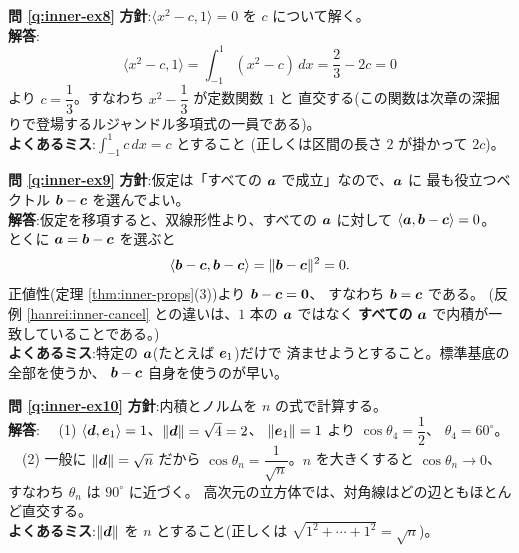 \bigskip
\noindent\textbf{問 \ref{q:inner-ex8}}\quad
\textbf{方針}:$\langle x^2 - c, 1 \rangle = 0$ を $c$ について解く。\\
\textbf{解答}:
\[
\langle x^2 - c, 1 \rangle = \int_{-1}^{1} (x^2 - c)\,dx
= \frac{2}{3} - 2c = 0
\]
より $c = \dfrac{1}{3}$。すなわち $x^2 - \dfrac{1}{3}$ が定数関数 $1$ と
直交する(この関数は次章の深掘りで登場するルジャンドル多項式の一員である)。\\
\textbf{よくあるミス}:$\int_{-1}^{1} c\,dx = c$ とすること
(正しくは区間の長さ $2$ が掛かって $2c$)。

\bigskip
\noindent\textbf{問 \ref{q:inner-ex9}}\quad
\textbf{方針}:仮定は「すべての $\bm{a}$ で成立」なので、$\bm{a}$ に
最も役立つベクトル $\bm{b} - \bm{c}$ を選んでよい。\\
\textbf{解答}:仮定を移項すると、双線形性より、すべての $\bm{a}$ に対して
$\langle \bm{a}, \bm{b} - \bm{c} \rangle = 0$。
とくに $\bm{a} = \bm{b} - \bm{c}$ を選ぶと
\[
\langle \bm{b} - \bm{c}, \bm{b} - \bm{c} \rangle
= \|\bm{b} - \bm{c}\|^2 = 0.
\]
正値性(定理 \ref{thm:inner-props}(3))より $\bm{b} - \bm{c} = \bm{0}$、
すなわち $\bm{b} = \bm{c}$ である。
(反例 \ref{hanrei:inner-cancel} との違いは、$1$ 本の $\bm{a}$ ではなく
\textbf{すべての} $\bm{a}$ で内積が一致していることである。)\\
\textbf{よくあるミス}:特定の $\bm{a}$(たとえば $\bm{e}_1$)だけで
済ませようとすること。標準基底の全部を使うか、
$\bm{b} - \bm{c}$ 自身を使うのが早い。

\bigskip
\noindent\textbf{問 \ref{q:inner-ex10}}\quad
\textbf{方針}:内積とノルムを $n$ の式で計算する。\\
\textbf{解答}:
　(1) $\langle \bm{d}, \bm{e}_1 \rangle = 1$、$\|\bm{d}\| = \sqrt{4} = 2$、
$\|\bm{e}_1\| = 1$ より $\cos\theta_4 = \dfrac{1}{2}$、
$\theta_4 = 60^\circ$。\\
　(2) 一般に $\|\bm{d}\| = \sqrt{n}$ だから
$\cos\theta_n = \dfrac{1}{\sqrt{n}}$。$n$ を大きくすると
$\cos\theta_n \to 0$、すなわち $\theta_n$ は $90^\circ$ に近づく。
高次元の立方体では、対角線はどの辺ともほとんど直交する。\\
\textbf{よくあるミス}:$\|\bm{d}\|$ を $n$ とすること(正しくは
$\sqrt{1^2 + \cdots + 1^2} = \sqrt{n}$)。

